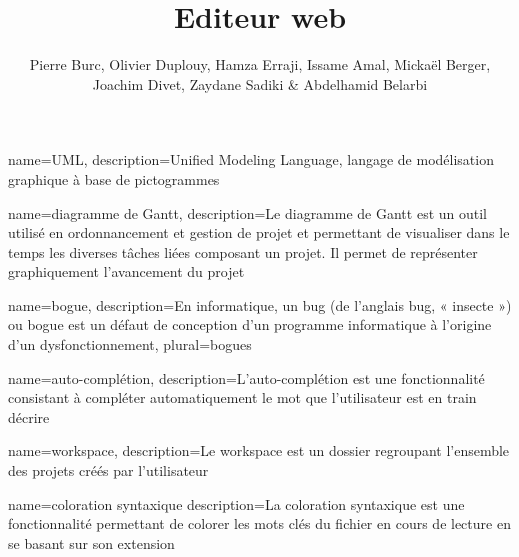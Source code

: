 \documentclass[a4paper, 12pt]{report}
\title{Editeur web}
\author{Pierre Burc, Olivier Duplouy, Hamza Erraji, Issame Amal, Mickaël Berger, Joachim Divet, Zaydane Sadiki & Abdelhamid Belarbi}
\begin{document}
	{
		name=UML,
		description={Unified Modeling Language, langage de modélisation graphique à base de pictogrammes}
	}

	{
		name=diagramme de Gantt,
		description={Le diagramme de Gantt est un outil utilisé en ordonnancement et gestion de projet et permettant de visualiser dans le temps
		les diverses tâches liées composant un projet. Il permet de représenter graphiquement l'avancement du projet}
	}
	
	{
		name=bogue,
		description={En informatique, un bug (de l’anglais bug, « insecte ») ou bogue est un défaut de conception d'un programme
		informatique à l'origine d'un dysfonctionnement},
		plural=bogues
	}
	
	{	
		name=auto-complétion,
		description={L'auto-complétion est une fonctionnalité consistant à compléter automatiquement le mot que l'utilisateur est en train décrire}
	}
	
	{
		name=workspace,
		description={Le workspace est un dossier regroupant l'ensemble des projets créés par l'utilisateur}
	}
	
	{
		name=coloration syntaxique
		description={La coloration syntaxique est une fonctionnalité permettant de colorer les mots clés du fichier en cours de lecture en se basant sur son extension}
	}
	
\end{document}

